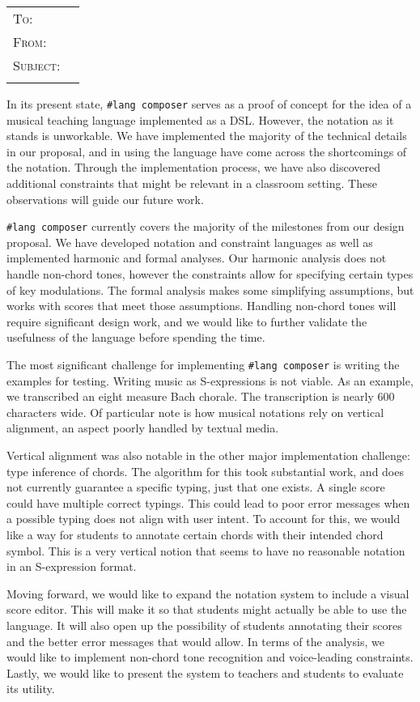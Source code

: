 \documentclass{article}
\makeatletter
\newcommand{\makeheader}{%
  \noindent
  \begin{tabular}{@{}ll}
    \ifdefined\@recipient
      \textsc{To: } & \@recipient{} \\
    \fi
    \ifdefined\@from
      \textsc{From: } & \@from{} \\
    \fi
    \ifdefined\@subject
      \textsc{Subject: } & \@subject{} \\
    \fi
  \end{tabular}
  \vspace{1\baselineskip}
}
\newcommand{\composer}{\texttt{\#lang composer}}
\makeatother
\begin{document}
\makeheader{}

In its present state, \composer{} serves as a proof of concept for the idea of a
musical teaching language implemented as a DSL. However, the notation as it
stands is unworkable. We have implemented the majority of the technical details
in our proposal, and in using the language have come across the shortcomings of
the notation. Through the implementation process, we have also discovered
additional constraints that might be relevant in a classroom setting. These
observations will guide our future work.

\composer{} currently covers the majority of the milestones from our design
proposal. We have developed notation and constraint languages as well as
implemented harmonic and formal analyses. Our harmonic analysis does not handle
non-chord tones, however the constraints allow for specifying certain types of
key modulations. The formal analysis makes some simplifying assumptions, but
works with scores that meet those assumptions. Handling non-chord tones will
require significant design work, and we would like to further validate the
usefulness of the language before spending the time.

The most significant challenge for implementing \composer{} is writing the
examples for testing. Writing music as S-expressions is not viable. As an
example, we transcribed an eight measure Bach chorale. The transcription is
nearly 600 characters wide. Of particular note is how musical notations rely on
vertical alignment, an aspect poorly handled by textual media.

Vertical alignment was also notable in the other major implementation challenge:
type inference of chords. The algorithm for this took substantial work, and does
not currently guarantee a specific typing, just that one exists. A single score
could have multiple correct typings. This could lead to poor error messages when
a possible typing does not align with user intent. To account for this, we would
like a way for students to annotate certain chords with their intended chord
symbol. This is a very vertical notion that seems to have no reasonable
notation in an S-expression format.

Moving forward, we would like to expand the notation system to include a visual
score editor. This will make it so that students might actually be able to use
the language. It will also open up the possibility of students annotating their
scores and the better error messages that would allow. In terms of the analysis,
we would like to implement non-chord tone recognition and voice-leading
constraints. Lastly, we would like to present the system to teachers and
students to evaluate its utility.
\end{document}
